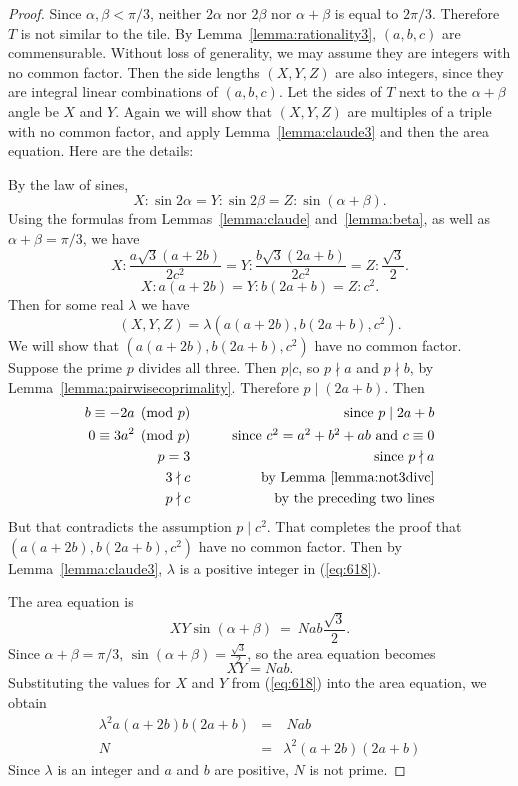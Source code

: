 \documentclass{amsart}
\theoremstyle{plain}
\theoremstyle{definition}
\theoremstyle{remark}
\begin{document}
\begin{proof} 
 Since $\alpha, \beta < \pi/3$,  neither $2\alpha$ nor $2\beta$ nor $\alpha+\beta$ is equal to $2\pi/3$. 
Therefore $T$ is not similar to the tile.
By Lemma~\ref{lemma:rationality3}, $(a,b,c)$ are commensurable.
Without loss of generality, we may assume they are integers with no common factor.
Then the side lengths $(X,Y,Z)$ are also integers, since they are integral linear
combinations of $(a,b,c)$.  
Let the sides of $T$ next to the $\alpha + \beta$ angle be $X$ and $Y$.  
Again we will show that $(X,Y,Z)$ are multiples of a triple with no common factor, and apply Lemma~\ref{lemma:claude3} 
and then the area equation.   Here are the details:

By the law of sines,
$$ X: {\sin 2\alpha} =   Y :{\sin 2\beta} = Z :{\sin (\alpha + \beta)}.$$
Using the formulas from Lemmas~\ref{lemma:claude} and~\ref{lemma:beta},  as well as $\alpha + \beta = \pi/3$, we have
$$ X: \frac {a \sqrt 3 (a+2b)}{2c^2} = Y:\frac {b \sqrt 3 (2a+b)}{2c^2} = Z: \frac{\sqrt 3 } 2 .$$
$$ X: a(a+2b) = Y : b(2a+b) = Z: c^2.$$
Then for some real $\lambda$ we have
\begin{equation}
 (X,Y,Z) = \lambda (a(a+2b), b(2a+b), c^2). \label{eq:618}
 \end{equation}
 We will show that $(a(a+2b), b(2a+b), c^2)$ have no common factor.  
 Suppose the prime $p$ divides all three. Then $p|c$, so $p \nmid a$ and $p \nmid b$,
 by Lemma~\ref{lemma:pairwisecoprimality}.
 Therefore $p \mid (2a + b)$.  Then
 \begin{eqnarray*}
 b \equiv -2a \pmod p   && \mbox{\qquad since $p \mid 2a+b$}\\
 0  \equiv 3a^2 \pmod p && \mbox{\qquad since $c^2 = a^2 + b^2 + ab$ and $c \equiv 0$}\\
 p = 3                   && \mbox{\qquad since $p \nmid a$} \\
 3 \nmid c               && \mbox{\qquad by  Lemma~\ref{lemma:not3divc}} \\
 p \nmid c               && \mbox{\qquad by the preceding two lines} 
 \end{eqnarray*}
 But that contradicts the assumption $p \mid c^2$.  That completes
 the proof that  $(a(a+2b), b(2a+b), c^2)$ have no common factor.
Then by Lemma~\ref{lemma:claude3}, $\lambda$ is a positive integer in (\ref{eq:618}).

The area equation  is 
$$ XY \sin (\alpha +\beta) \ = \ N ab \frac {\sqrt 3} 2.$$
Since $\alpha + \beta = \pi/3$, $\sin(\alpha+\beta) = \tfrac{\sqrt 3} 2$, so 
the area equation becomes
$$ XY = N ab.$$
Substituting the values for $X$ and $Y$ from (\ref{eq:618}) into the area equation,
we obtain
\begin{eqnarray*}
\lambda^2 a(a+2b) b(2a+b)&=& \ N ab  \\
N &=& \lambda^2 (a+2b) (2a+b)  
\end{eqnarray*}
Since $\lambda$ is an integer and $a$ and $b$ are positive, 
 $N$ is not prime.
\end{proof}
\end{document}
